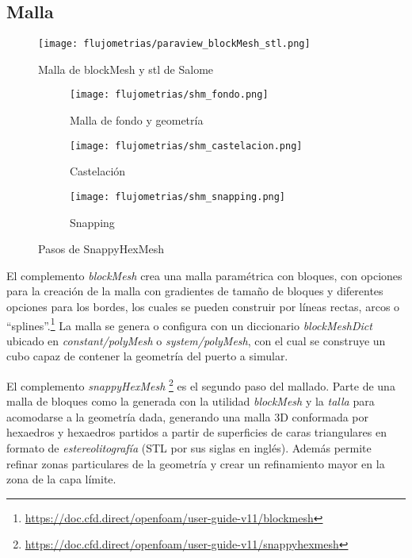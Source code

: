 \subsection{Malla}\label{sec:cap3_of_malla}
%

\begin{figure}[h!]  \centering
\texttt{[image: flujometrias/paraview\_blockMesh\_stl.png]}
    \caption{Malla de blockMesh y stl de Salome}\label{fig:paraview_blockMesh_stl}
\end{figure}

\begin{figure}[h!]  \centering
    \begin{subfigure}[t]{0.5\textwidth} \centering
\texttt{[image: flujometrias/shm\_fondo.png]}
        \caption{Malla de fondo y geometría}
    \end{subfigure}%
    \begin{subfigure}[t]{0.5\textwidth} \centering
\texttt{[image: flujometrias/shm\_castelacion.png]}
        \caption{Castelación}
    \end{subfigure}
    \begin{subfigure}[t]{0.5\textwidth} \centering
\texttt{[image: flujometrias/shm\_snapping.png]}
        \caption{Snapping}
    \end{subfigure}
    \caption{Pasos de SnappyHexMesh\parencite{shm_steps}}\label{fig:openfoam_shm_pasos}
\end{figure}

El complemento \emph{blockMesh} crea una malla paramétrica con bloques, con
opciones para la creación de la malla con gradientes de tamaño de bloques y
diferentes opciones para los bordes, los cuales se pueden construir por líneas
rectas, arcos o
``splines''.\footnote{\url{https://doc.cfd.direct/openfoam/user-guide-v11/blockmesh}}
%
La malla se genera o configura con un diccionario \emph{blockMeshDict} ubicado
en \emph{constant/polyMesh} o \emph{system/polyMesh}, con el cual se construye
un cubo capaz de contener la geometría del puerto a simular.

El complemento \emph{snappyHexMesh}
\footnote{\url{https://doc.cfd.direct/openfoam/user-guide-v11/snappyhexmesh}} es
el segundo paso del mallado.
%
Parte de una malla de bloques como la generada con la utilidad \emph{blockMesh}
y la \emph{talla} para acomodarse a la geometría dada, generando una malla 3D
conformada por hexaedros y hexaedros partidos a partir de superficies de caras
triangulares en formato de \emph{estereolitografía} (STL por sus siglas en
inglés).
%
Además permite refinar zonas particulares de la geometría y crear un
refinamiento mayor en la zona de la capa límite.

